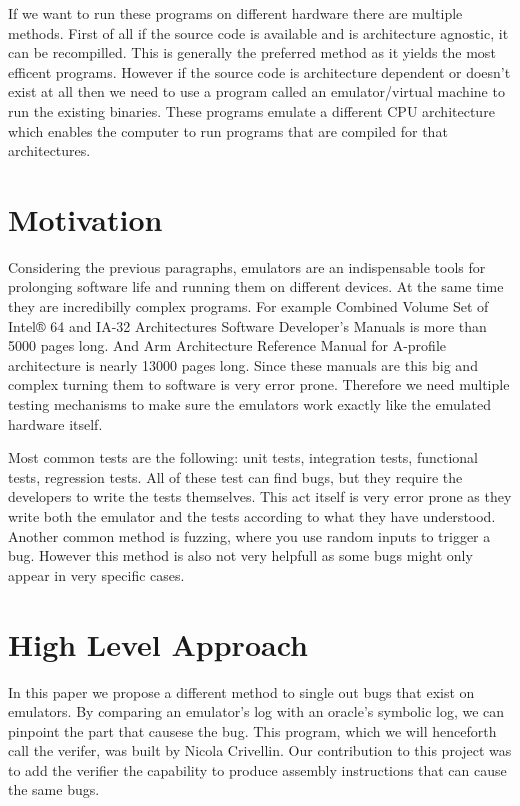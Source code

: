 If we want to run these programs on different hardware there are multiple methods.
First of all if the source code is available and is architecture agnostic, it can be recompilled.
This is generally the preferred method as it yields the most efficent programs.
However if the source code is architecture dependent or doesn't exist at all then we need to use a program called an emulator/virtual machine to run the existing binaries.
These programs emulate a different CPU architecture which enables the computer to run programs that are compiled for that architectures. 

\section{Motivation}
Considering the previous paragraphs, emulators are an indispensable tools for prolonging software life and running them on different devices.
At the same time they are incredibilly complex programs.
For example Combined Volume Set of Intel® 64 and IA-32 Architectures Software Developer’s Manuals \cite{intel_manual} is more than 5000 pages long.
And Arm Architecture Reference Manual for A-profile architecture \cite{arm_manual} is nearly 13000 pages long.
Since these manuals are this big and complex turning them to software is very error prone.
Therefore we need multiple testing mechanisms to make sure the emulators work exactly like the emulated hardware itself.

Most common tests are the following: unit tests, integration tests, functional tests, regression tests.
All of these test can find bugs, but they require the developers to write the tests themselves.
This act itself is very error prone as they write both the emulator and the tests according to what they have understood.
Another common method is fuzzing, where you use random inputs to trigger a bug.
However this method is also not very helpfull as some bugs might only appear in very specific cases.

\section{High Level Approach}
In this paper we propose a different method to single out bugs that exist on emulators.
By comparing an emulator's log with an oracle's symbolic log, we can pinpoint the part that causese the bug.
This program, which we will henceforth call the verifer, was built by Nicola Crivellin.
Our contribution to this project was to add the verifier the capability to produce assembly instructions that can cause the same bugs.

